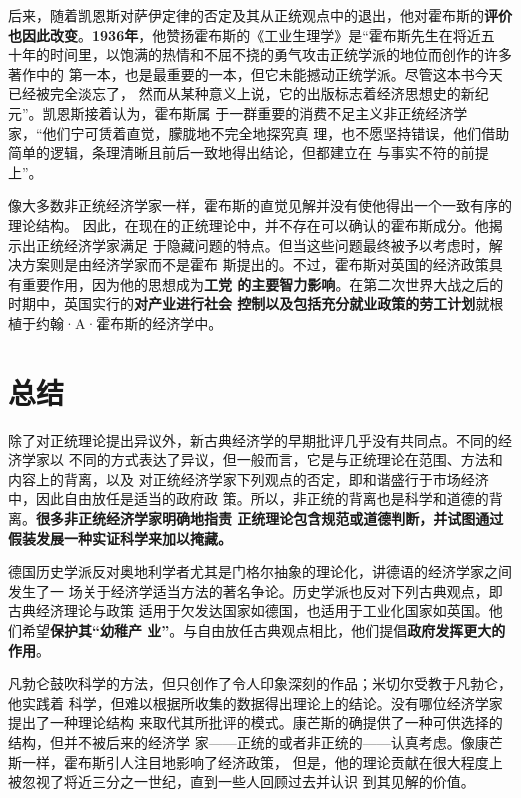 后来，随着凯恩斯对萨伊定律的否定及其从正统观点中的退出，他对霍布斯的\textbf{评价
也因此改变}。\textbf{1936年}，他赞扬霍布斯的《工业生理学》是“霍布斯先生在将近五
十年的时间里，以饱满的热情和不屈不挠的勇气攻击正统学派的地位而创作的许多著作中的
第一本，也是最重要的一本，但它未能撼动正统学派。尽管这本书今天已经被完全淡忘了，
然而从某种意义上说，它的出版标志着经济思想史的新纪元”。凯恩斯接着认为，霍布斯属
于一群重要的消费不足主义非正统经济学家，“他们宁可赁着直觉，朦胧地不完全地探究真
理，也不愿坚持错误，他们借助简单的逻辑，条理清晰且前后一致地得出结论，但都建立在
与事实不符的前提上”。

像大多数非正统经济学家一样，霍布斯的直觉见解并没有使他得出一个一致有序的理论结构。
因此，在现在的正统理论中，并不存在可以确认的霍布斯成分。他揭示出正统经济学家满足
于隐藏问题的特点。但当这些问题最终被予以考虑时，解决方案则是由经济学家而不是霍布
斯提出的。不过，霍布斯对英国的经济政策具有重要作用，因为他的思想成为\textbf{工党
的主要智力影响}。在第二次世界大战之后的时期中，英国实行的\textbf{对产业进行社会
控制以及包括充分就业政策的劳工计划}就根植于约翰·A·霍布斯的经济学中。

\section{总结}

除了对正统理论提出异议外，新古典经济学的早期批评几乎没有共同点。不同的经济学家以
不同的方式表达了异议，但一般而言，它是与正统理论在范围、方法和内容上的背离，以及
对正统经济学家下列观点的否定，即和谐盛行于市场经济中，因此自由放任是适当的政府政
策。所以，非正统的背离也是科学和道德的背离。\textbf{很多非正统经济学家明确地指责
正统理论包含规范或道德判断，并试图通过假装发展一种实证科学来加以掩藏。}

德国历史学派反对奥地利学者尤其是门格尔抽象的理论化，讲德语的经济学家之间发生了一
场关于经济学适当方法的著名争论。历史学派也反对下列古典观点，即古典经济理论与政策
适用于欠发达国家如德国，也适用于工业化国家如英国。他们希望\textbf{保护其“幼稚产
业”}。与自由放任古典观点相比，他们提倡\textbf{政府发挥更大的作用}。

凡勃仑鼓吹科学的方法，但只创作了令人印象深刻的作品；米切尔受教于凡勃仑，他实践着
科学，但难以根据所收集的数据得出理论上的结论。没有哪位经济学家提出了一种理论结构
来取代其所批评的模式。康芒斯的确提供了一种可供选择的结构，但并不被后来的经济学
家——正统的或者非正统的——认真考虑。像康芒斯一样，霍布斯引人注目地影响了经济政策，
但是，他的理论贡献在很大程度上被忽视了将近三分之一世纪，直到一些人回顾过去并认识
到其见解的价值。


